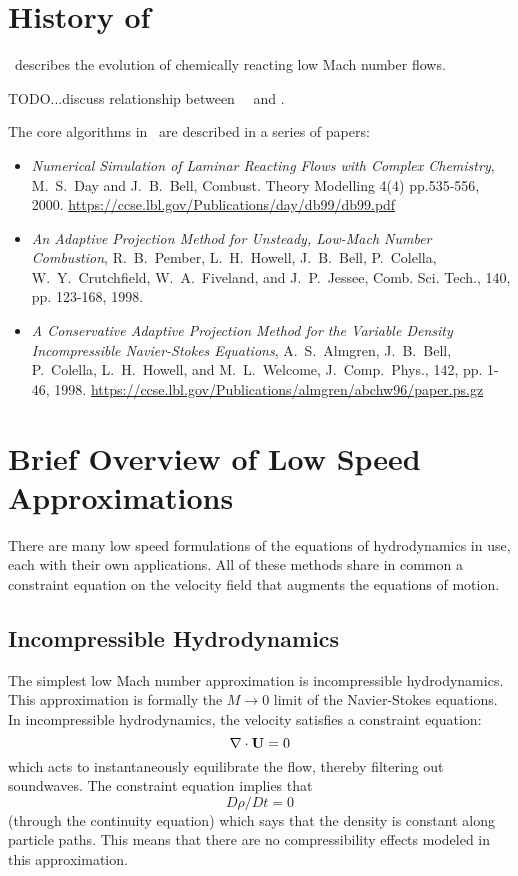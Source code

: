 \section{History of \pelelm}

\pelelm\ describes the evolution of chemically reacting low Mach number flows.

TODO...discuss relationship between \amrex\, \iamr\ and \pelelm.

The core algorithms in \pelelm\ are described in a series of papers:
\begin{itemize}
\item {\it Numerical Simulation of Laminar Reacting Flows with Complex Chemistry}, M.~S.~Day and J.~B.~Bell,
  Combust. Theory Modelling 4(4) pp.535-556, 2000.
  \url{https://ccse.lbl.gov/Publications/day/db99/db99.pdf}

\item {\it An Adaptive Projection Method for Unsteady, Low-Mach Number Combustion}, 
  R.~B.~Pember, L.~H.~Howell, J.~B.~Bell, P.~Colella, W.~Y.~Crutchfield, W.~A.~Fiveland, and J.~P.~Jessee,
  Comb. Sci. Tech., 140, pp. 123-168, 1998.

\item {\it A Conservative Adaptive Projection Method for the Variable Density Incompressible Navier-Stokes Equations},
  A.~S.~Almgren, J.~B.~Bell, P.~Colella, L.~H.~Howell, and M.~L.~Welcome, J.~Comp.~Phys., 142, pp. 1-46, 1998.
  \url{https://ccse.lbl.gov/Publications/almgren/abchw96/paper.ps.gz}

\end{itemize}         

\section{Brief Overview of Low Speed Approximations}

There are many low speed formulations of the equations of hydrodynamics
in use, each with their own applications.  All of these methods share in
common a constraint equation on the velocity field that augments the
equations of motion.  

\subsection{Incompressible Hydrodynamics}

The simplest low Mach number approximation is incompressible
hydrodynamics. This approximation is formally the $M \rightarrow 0$
limit of the Navier-Stokes equations. In incompressible hydrodynamics,
the velocity satisfies a constraint equation:
\begin{equation}
\nabla \cdot {\bf U} = 0
\end{equation}
which acts to instantaneously equilibrate the flow, thereby filtering
out soundwaves.  The constraint equation implies that
\begin{equation}
D\rho/Dt = 0
\end{equation}
(through the continuity equation) which says that the density is
constant along particle paths. This means that there are no
compressibility effects modeled in this approximation.


